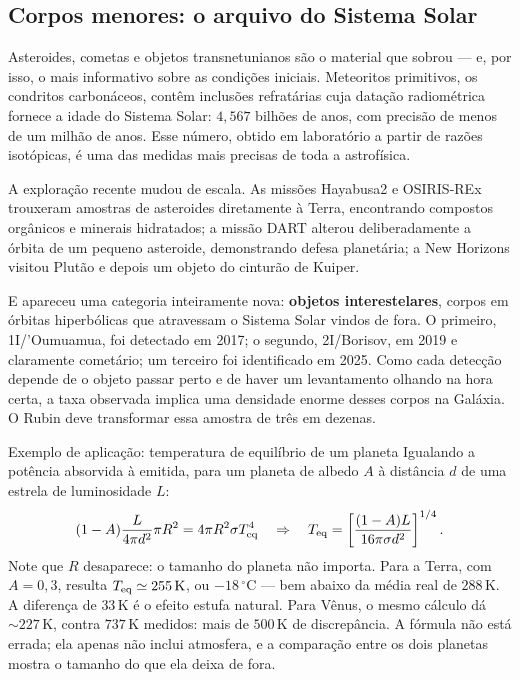 \documentclass[11pt,a4paper]{article}
\begin{document}
\subsection*{Corpos menores: o arquivo do Sistema Solar}

Asteroides, cometas e objetos transnetunianos são o material que sobrou --- e, por isso, o mais informativo sobre as condições iniciais. Meteoritos primitivos, os condritos carbonáceos, contêm inclusões refratárias cuja datação radiométrica fornece a idade do Sistema Solar: $4{,}567$ bilhões de anos, com precisão de menos de um milhão de anos. Esse número, obtido em laboratório a partir de razões isotópicas, é uma das medidas mais precisas de toda a astrofísica.

A exploração recente mudou de escala. As missões Hayabusa2 e OSIRIS-REx trouxeram amostras de asteroides diretamente à Terra, encontrando compostos orgânicos e minerais hidratados; a missão DART alterou deliberadamente a órbita de um pequeno asteroide, demonstrando defesa planetária; a New Horizons visitou Plutão e depois um objeto do cinturão de Kuiper.

E apareceu uma categoria inteiramente nova: \textbf{objetos interestelares}, corpos em órbitas hiperbólicas que atravessam o Sistema Solar vindos de fora. O primeiro, 1I/'Oumuamua, foi detectado em 2017; o segundo, 2I/Borisov, em 2019 e claramente cometário; um terceiro foi identificado em 2025. Como cada detecção depende de o objeto passar perto e de haver um levantamento olhando na hora certa, a taxa observada implica uma densidade enorme desses corpos na Galáxia. O Rubin deve transformar essa amostra de três em dezenas.

\begin{lessonblock}{Exemplo de aplicação: temperatura de equilíbrio de um planeta}
Igualando a potência absorvida à emitida, para um planeta de albedo $A$ à distância $d$ de uma estrela de luminosidade $L$:
\[
(1-A)\frac{L}{4\pi d^{2}}\pi R^{2}=4\pi R^{2}\sigma T_{\rm eq}^{4}
\quad\Rightarrow\quad
T_{\rm eq}=\left[\frac{(1-A)L}{16\pi\sigma d^{2}}\right]^{1/4}.
\]
Note que $R$ desaparece: o tamanho do planeta não importa. Para a Terra, com $A=0{,}3$, resulta $T_{\rm eq}\simeq255\,\mathrm{K}$, ou $-18\,^\circ\mathrm{C}$ --- bem abaixo da média real de $288\,\mathrm{K}$. A diferença de $33\,\mathrm{K}$ é o efeito estufa natural. Para Vênus, o mesmo cálculo dá $\sim227\,\mathrm{K}$, contra $737\,\mathrm{K}$ medidos: mais de $500\,\mathrm{K}$ de discrepância. A fórmula não está errada; ela apenas não inclui atmosfera, e a comparação entre os dois planetas mostra o tamanho do que ela deixa de fora.
\end{lessonblock}
\end{document}
